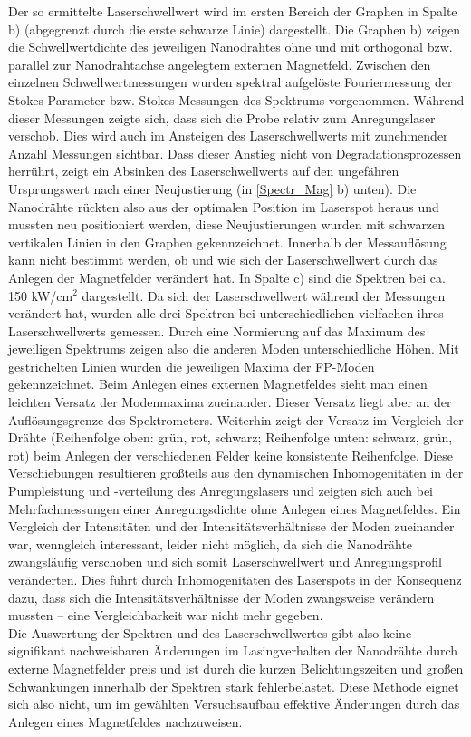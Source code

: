 \begin{figure}[b]
\end{figure} Der so ermittelte Laserschwellwert wird im ersten Bereich der Graphen in Spalte b) (abgegrenzt durch die erste schwarze Linie) dargestellt. Die Graphen b) zeigen die Schwellwertdichte des jeweiligen Nanodrahtes ohne und mit orthogonal bzw. parallel zur Nanodrahtachse angelegtem externen Magnetfeld. Zwischen den einzelnen Schwellwertmessungen wurden spektral aufgelöste Fouriermessung der Stokes-Parameter bzw. Stokes-Messungen des Spektrums vorgenommen. Während dieser Messungen zeigte sich, dass sich die Probe relativ zum Anregungslaser verschob. Dies wird auch im Ansteigen des Laserschwellwerts mit zunehmender Anzahl Messungen sichtbar. Dass dieser Anstieg nicht von Degradationsprozessen herrührt, zeigt ein Absinken des Laserschwellwerts auf den ungefähren Ursprungswert nach einer Neujustierung (in \autoref{Spectr_Mag} b) unten). Die Nanodrähte rückten also aus der optimalen Position im Laserspot heraus und mussten neu positioniert werden, diese Neujustierungen wurden mit schwarzen vertikalen Linien in den Graphen gekennzeichnet. Innerhalb der Messauflösung kann nicht bestimmt werden, ob und wie sich der Laserschwellwert durch das Anlegen der Magnetfelder verändert hat. In Spalte c) sind die Spektren bei ca. 150 kW/cm$^{2}$ dargestellt. Da sich der Laserschwellwert während der Messungen verändert hat, wurden alle drei Spektren bei unterschiedlichen vielfachen ihres Laserschwellwerts gemessen. Durch eine Normierung auf das Maximum des jeweiligen Spektrums zeigen also die anderen Moden unterschiedliche Höhen. Mit gestrichelten Linien wurden die jeweiligen Maxima der FP-Moden gekennzeichnet. Beim Anlegen eines externen Magnetfeldes sieht man einen leichten Versatz der Modenmaxima zueinander. Dieser Versatz liegt aber an der Auflösungsgrenze des Spektrometers. Weiterhin zeigt der Versatz im Vergleich der Drähte (Reihenfolge oben: grün, rot, schwarz; Reihenfolge unten: schwarz, grün, rot) beim Anlegen der verschiedenen Felder keine konsistente Reihenfolge. Diese Verschiebungen resultieren großteils aus den dynamischen Inhomogenitäten in der Pumpleistung und -verteilung des Anregungslasers und zeigten sich auch bei Mehrfachmessungen einer Anregungsdichte ohne Anlegen eines Magnetfeldes. Ein Vergleich der Intensitäten und der Intensitätsverhältnisse der Moden zueinander war, wenngleich interessant, leider nicht möglich, da sich die Nanodrähte zwangsläufig verschoben und sich somit Laserschwellwert und Anregungsprofil veränderten. Dies führt durch Inhomogenitäten des Laserspots in der Konsequenz dazu, dass sich die Intensitätsverhältnisse der Moden zwangsweise verändern mussten – eine Vergleichbarkeit war nicht mehr gegeben.   
\\
Die Auswertung der Spektren und des Laserschwellwertes gibt also keine signifikant nachweisbaren Änderungen  im Lasingverhalten der Nanodrähte durch externe Magnetfelder preis und ist durch die kurzen Belichtungszeiten und großen Schwankungen innerhalb der Spektren stark fehlerbelastet. Diese Methode eignet sich also nicht, um im gewählten Versuchsaufbau effektive Änderungen durch das Anlegen eines Magnetfeldes nachzuweisen.
